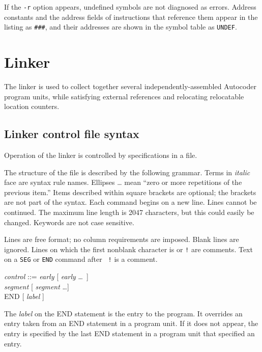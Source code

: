 \documentclass[12pt,twoside]{article}
\begin{document}
If the {\tt -r} option appears, undefined symbols are not diagnosed as
errors.  Address constants and the address fields of instructions that
reference them appear in the listing as {\tt \#\#\#}, and their
addresses are shown in the symbol table as {\tt UNDEF}.
\raggedbottom

\section{Linker}

The linker is used to collect together several independently-assembled
Autocoder program units, while satisfying external references and
relocating relocatable location counters.

\subsection{Linker control file syntax}

Operation of the linker is controlled by specifications in a file.

The structure of the file is described by the following grammar.  Terms
in \emph{italic} face are syntax rule names.  Ellipses {\dots} mean
``zero or more repetitions of the previous item.''  Items described
within square brackets are optional; the brackets are not part of the
syntax.  Each command begins on a new line.  Lines cannot be continued. 
The maximum line length is 2047 characters, but this could easily be
changed. Keywords are not case sensitive.

Lines are free format; no column requirements are imposed.  Blank lines
are ignored.  Lines on which the first nonblank character is {\tt *} or
{\tt !} are comments.  Text on a {\tt SEG} or {\tt END} command after {\tt
!} is a comment.

\newcommand{\pro}{::= }
\newcommand{\R}{{\bf or }}
\newcommand{\X}[1]{\vskip -0.25in \hspace*{1in}\parbox{5.5in}{#1}}

\begin{tabbing}
\emph{control} \pro \= \emph{early} [ \emph{early} \dots\ ]\\
\> \emph{segment} [ \emph{segment} \dots ] \\
\> END [ \emph{label} ]
\end{tabbing}

The \emph{label} on the END statement is the entry to the program.  It
overrides an entry taken from an END statement in a program unit.  If it
does not appear, the entry is specified by the last END statement in a
program unit that specified an entry.
\end{document}
